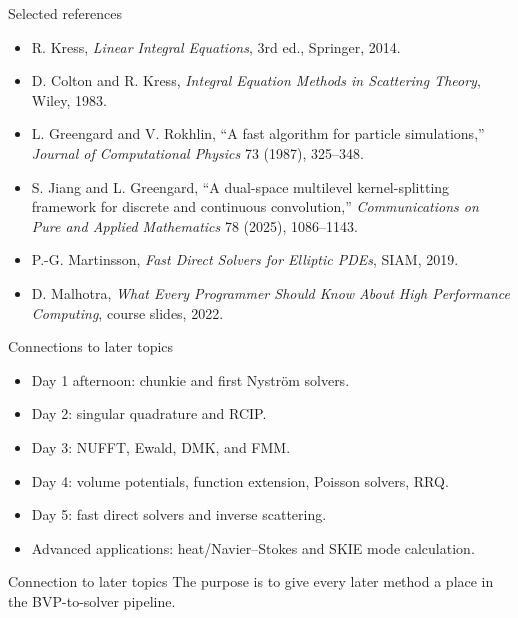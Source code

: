 \documentclass[aspectratio=169,11pt]{beamer}
\begin{document}
\begin{frame}{Selected references}
\footnotesize
\begin{itemize}
  \item R. Kress, \emph{Linear Integral Equations}, 3rd ed., Springer, 2014.
  \item D. Colton and R. Kress, \emph{Integral Equation Methods in Scattering Theory}, Wiley, 1983.
  \item L. Greengard and V. Rokhlin, ``A fast algorithm for particle simulations,'' \emph{Journal of Computational Physics} 73 (1987), 325--348.
  \item S. Jiang and L. Greengard, ``A dual-space multilevel kernel-splitting framework for discrete and continuous convolution,'' \emph{Communications on Pure and Applied Mathematics} 78 (2025), 1086--1143.
  \item P.-G. Martinsson, \emph{Fast Direct Solvers for Elliptic PDEs}, SIAM, 2019.
  \item D. Malhotra, \emph{What Every Programmer Should Know About High Performance Computing}, course slides, 2022.
\end{itemize}
\end{frame}

\begin{frame}{Connections to later topics}
\small
\begin{itemize}
  \item Day 1 afternoon: chunkie and first Nystr\"om solvers.
  \item Day 2: singular quadrature and RCIP.
  \item Day 3: NUFFT, Ewald, DMK, and FMM.
  \item Day 4: volume potentials, function extension, Poisson solvers, RRQ.
  \item Day 5: fast direct solvers and inverse scattering.
  \item Advanced applications: heat/Navier--Stokes and SKIE mode calculation.
\end{itemize}

\begin{block}{Connection to later topics}
The purpose is to give every later method a place in the BVP-to-solver pipeline.
\end{block}
\end{frame}
\end{document}

